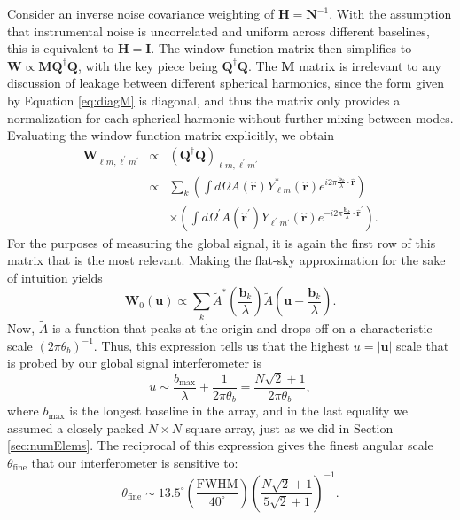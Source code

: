 \documentclass[twocolumn,apj,numberedappendix]{emulateapj}
\newcommand{\Hmat}{\mathbf{H}}
\newcommand{\Q}{\mathbf{Q}}
\newcommand{\M}{\mathbf{M}}
\newcommand{\W}{\mathbf{W}}
\newcommand{\rhat}{\hat{\mathbf{r}}}
\begin{document}
Consider an inverse noise covariance weighting of $\Hmat = \mathbf{N}^{-1}$. With the assumption that instrumental noise is uncorrelated and uniform across different baselines, this is equivalent to $\Hmat = \mathbf{I}$. The window function matrix then simplifies to $\W \propto \M \Q^\dagger \Q$, with the key piece being $\Q^\dagger \Q$. The $\M$ matrix is irrelevant to any discussion of leakage between different spherical harmonics, since the form given by Equation \eqref{eq:diagM} is diagonal, and thus the matrix only provides a normalization for each spherical harmonic without further mixing between modes. Evaluating the window function matrix explicitly, we obtain
\begin{eqnarray}
\W_{\ell m, \ell^\prime m^\prime} &\propto& \left( \Q^\dagger \Q \right)_{\ell m, \ell^\prime m^\prime} \nonumber \\
& \propto & \sum_k \left( \int d\Omega A(\rhat) Y^*_{\ell m}(\rhat) e^{i 2 \pi \frac{\mathbf{b}_k}{\lambda} \cdot \rhat }\right) \nonumber \\
&& \times \left( \int d\Omega^\prime A(\rhat^\prime) Y_{\ell^\prime m^\prime}(\rhat) e^{-i 2 \pi \frac{\mathbf{b}_k}{\lambda} \cdot \rhat^\prime }\right).
\end{eqnarray}
For the purposes of measuring the global signal, it is again the first row of this matrix that is the most relevant. Making the flat-sky approximation for the sake of intuition yields
\begin{equation}
\label{eq:AnotherApproxWindow}
\W_{0}(\mathbf{u}) \propto \sum_k \widetilde{A}^* \left( \frac{\mathbf{b}_k}{\lambda} \right) \widetilde{A} \left( \mathbf{u} - \frac{\mathbf{b}_k}{\lambda} \right).
\end{equation}
Now, $\widetilde{A}$ is a function that peaks at the origin and drops off on a characteristic scale $(2 \pi \theta_b)^{-1}$. Thus, this expression tells us that the highest $u = | \mathbf{u} |$ scale that is probed by our global signal interferometer is
\begin{equation}
u \sim \frac{b_\textrm{max}}{\lambda} + \frac{1}{2 \pi \theta_b} = \frac{N\sqrt{2} +1}{2 \pi \theta_b},
\end{equation}
where $b_\textrm{max}$ is the longest baseline in the array, and in the last equality we assumed a closely packed $N \times N$ square array, just as we did in Section \ref{sec:numElems}. The reciprocal of this expression gives the finest angular scale $\theta_\textrm{fine}$ that our interferometer is sensitive to:
\begin{equation}
\label{eq:AngularScaleProbed}
\theta_\textrm{fine} \sim 13.5^\circ \left( \frac{\textrm{FWHM}}{40^\circ} \right) \left( \frac{N \sqrt{2} + 1}{5 \sqrt{2} + 1} \right)^{-1}.
\end{equation}
\end{document}
